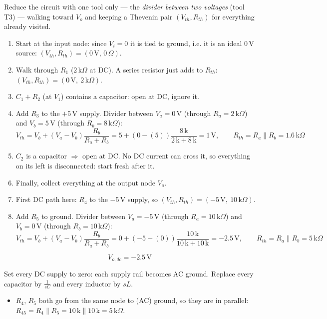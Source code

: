 \documentclass[11pt]{article}
\newcommand{\solstep}[2]{\par\medskip{\color{stepc}\textbf{Step #1 --- #2}}\par\nopagebreak}
\begin{document}
Reduce the circuit with one tool only --- the \emph{divider between two voltages} (tool T3) --- walking toward $V_o$ and keeping a Thevenin pair $(V_{th},R_{th})$ for everything already visited.
\begin{enumerate}[leftmargin=*,itemsep=2pt]
\item Start at the input node: since $V_i=0$ it is tied to ground, i.e. it is an ideal $0\,\mathrm{V}$ source: $(V_{th},R_{th})=(0\,\mathrm{V},\,0\,\Omega)$.
\item Walk through $R_{1}$ ($2\,\mathrm{k}\Omega$ at DC). A series resistor just adds to $R_{th}$: $(V_{th},R_{th}) = (0\,\mathrm{V},\ 2\,\mathrm{k}\Omega)$.
\item $C_{1} + R_{2}$ (at $V_{1}$) contains a capacitor: open at DC, ignore it.
\item Add $R_{3}$ to the $+5\,\mathrm{V}$ supply. Divider between $V_a=0\,\mathrm{V}$ (through $R_a=2\,\mathrm{k}\Omega$) and $V_b=5\,\mathrm{V}$ (through $R_b=8\,\mathrm{k}\Omega$):\[
V_{th} = V_b + (V_a-V_b)\frac{R_b}{R_a+R_b} = 5 + \left(0 - (5)\right)\frac{8\,\mathrm{k}}{2\,\mathrm{k} + 8\,\mathrm{k}} = 1\,\mathrm{V},\qquad R_{th} = R_a\parallel R_b = 1.6\,\mathrm{k}\Omega
\]

\item $C_{2}$ is a capacitor $\Rightarrow$ open at DC. No DC current can cross it, so everything on its left is disconnected: start fresh after it.
\item Finally, collect everything at the output node $V_o$.
\item First DC path here: $R_{4}$ to the $-5\,\mathrm{V}$ supply, so $(V_{th},R_{th}) = (-5\,\mathrm{V},\ 10\,\mathrm{k}\Omega)$.
\item Add $R_{5}$ to ground. Divider between $V_a=-5\,\mathrm{V}$ (through $R_a=10\,\mathrm{k}\Omega$) and $V_b=0\,\mathrm{V}$ (through $R_b=10\,\mathrm{k}\Omega$):\[
V_{th} = V_b + (V_a-V_b)\frac{R_b}{R_a+R_b} = 0 + \left(-5 - (0)\right)\frac{10\,\mathrm{k}}{10\,\mathrm{k} + 10\,\mathrm{k}} = -2.5\,\mathrm{V},\qquad R_{th} = R_a\parallel R_b = 5\,\mathrm{k}\Omega
\]

\end{enumerate}

\[
\boxed{V_{o,dc} = -2.5\,\mathrm{V}}
\]

\solstep{3}{AC circuit}Set every DC supply to zero: each supply rail becomes AC ground. Replace every capacitor by $\frac{1}{sC}$ and every inductor by $sL$.
\begin{itemize}[leftmargin=*,itemsep=2pt]
\item $R_{4}$, $R_{5}$ both go from the same node to (AC) ground, so they are in parallel: $R_{45} = R_{4} \parallel R_{5} = 10\,\mathrm{k} \parallel 10\,\mathrm{k} = 5\,\mathrm{k}\Omega$.
\end{itemize}
\end{document}
